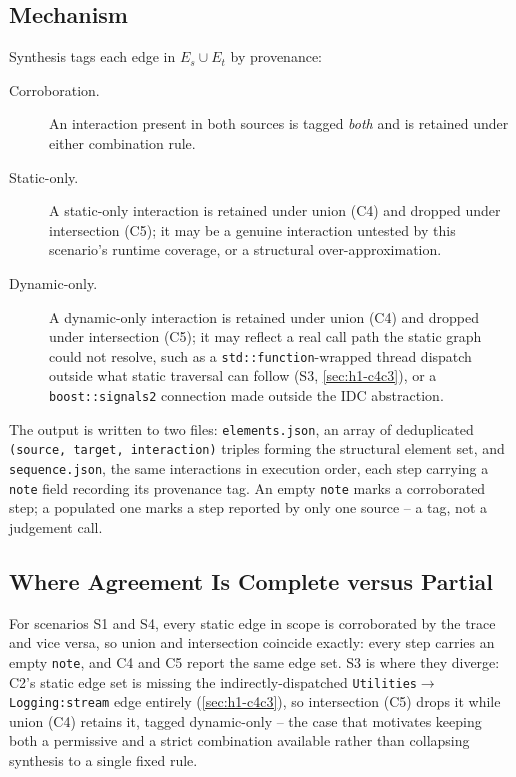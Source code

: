 \subsection{Mechanism}

Synthesis tags each edge in $E_s \cup E_t$ by provenance:

\begin{description}
  \item[Corroboration.] An interaction present in both sources is tagged
    \emph{both} and is retained under either combination rule.
  \item[Static-only.] A static-only interaction is retained under union
    (C4) and dropped under intersection (C5); it may be a genuine
    interaction untested by this scenario's runtime coverage, or a
    structural over-approximation.
  \item[Dynamic-only.] A dynamic-only interaction is retained under
    union (C4) and dropped under intersection (C5); it may reflect a
    real call path the static graph could not resolve, such as a
    \texttt{std::function}-wrapped thread dispatch outside what static
    traversal can follow (S3, \cref{sec:h1-c4c3}), or a
    \texttt{boost::signals2} connection made outside the \ac{IDC}
    abstraction.
\end{description}

The output is written to two files: \texttt{elements.json}, an array of
deduplicated \texttt{(source, target, interaction)} triples forming the
structural element set, and \texttt{sequence.json}, the same
interactions in execution order, each step carrying a \texttt{note}
field recording its provenance tag. An empty \texttt{note} marks a
corroborated step; a populated one marks a step reported by only one
source -- a tag, not a judgement call.

\subsection{Where Agreement Is Complete versus Partial}

For scenarios S1 and S4, every static edge in scope is corroborated by
the trace and vice versa, so union and intersection coincide exactly:
every step carries an empty \texttt{note}, and C4 and C5 report the same
edge set. S3 is where they diverge: C2's static edge set is missing the
indirectly-dispatched \texttt{Utilities}$\to$\texttt{Logging:stream}
edge entirely (\cref{sec:h1-c4c3}), so intersection (C5) drops it while
union (C4) retains it, tagged dynamic-only -- the case that motivates
keeping both a permissive and a strict combination available rather than
collapsing synthesis to a single fixed rule.

